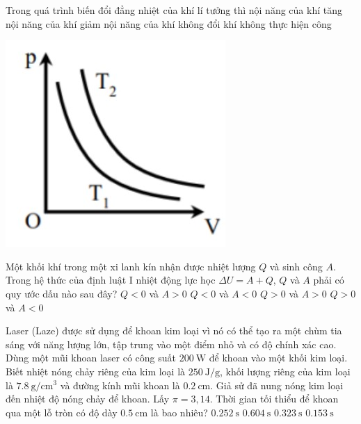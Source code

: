 \begin{ex}
	Trong quá trình biến đổi đẳng nhiệt của khí lí tưởng thì	
	\choice
	{nội năng của khí tăng}
	{nội năng của khí giảm}
	{\True nội năng của khí không đổi}
	{khí không thực hiện công}
\end{ex}
\begin{ex}
	{\vspace{-1cm}\includegraphics[scale=0.6]{../figs/FINAL-SEM1-003-3}}
	\loigiai{}
\end{ex}
\begin{ex}
	Một khối khí trong một xi lanh kín nhận được nhiệt lượng $Q$ và sinh công $A$. Trong hệ thức của định luật I nhiệt động lực học $\Delta U=A+Q$, $Q$ và $A$ phải có quy ước dấu nào sau đây?
	\choice
	{$Q<0$ và $A>0$}
	{$Q<0$ và $A<0$}
	{$Q>0$ và $A>0$}
	{\True $Q>0$ và $A<0$}
	\loigiai{}
\end{ex}
\begin{ex}
	Laser (Laze) được sử dụng để khoan kim loại vì nó có thể tạo ra một chùm tia sáng với năng lượng lớn, tập trung vào một điểm nhỏ và có độ chính xác cao. Dùng một mũi khoan laser có công suất $\SI{200}{\watt}$ để khoan vào một khối kim loại. Biết nhiệt nóng chảy riêng của kim loại là $\SI{250}{\joule/\gram}$, khối lượng riêng của kim loại là $\SI{7.8}{\gram/\centi\meter^3}$ và đường kính mũi khoan là $\SI{0.2}{\centi\meter}$. Giả sử đã nung nóng kim loại đến nhiệt độ nóng chảy để khoan. Lấy $\pi=3,14$. Thời gian tối thiểu để khoan qua một lỗ tròn có độ dày $\SI{0.5}{\centi\meter}$ là bao nhiêu?
	\choice
	{$\SI{0.252}{\second}$}
	{$\SI{0.604}{\second}$}
	{$\SI{0.323}{\second}$}
	{\True $\SI{0.153}{\second}$}
\end{ex}

